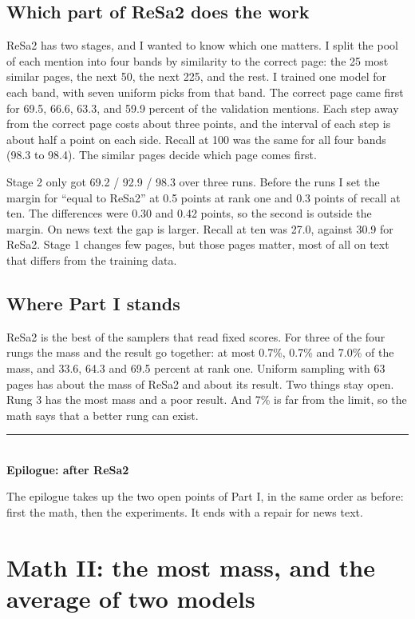 \documentclass[11pt]{article}
\theoremstyle{definition}
\newcommand{\partline}[1]{\vspace{1.2em}\noindent\rule{\textwidth}{0.4pt}\\[0.3em]{\Large\bfseries #1}\par\vspace{0.4em}}
\begin{document}
\subsection{Which part of ReSa2 does the work}
\label{sec:parts}

ReSa2 has two stages, and I wanted to know which one matters. I split the pool of each mention into four bands by similarity to the correct page: the 25 most similar pages, the next 50, the next 225, and the rest. I trained one model for each band, with seven uniform picks from that band. The correct page came first for 69.5, 66.6, 63.3, and 59.9 percent of the validation mentions. Each step away from the correct page costs about three points, and the interval of each step is about half a point on each side. Recall at 100 was the same for all four bands (98.3 to 98.4). The similar pages decide which page comes first.

Stage 2 only got 69.2 / 92.9 / 98.3 over three runs. Before the runs I set the margin for ``equal to ReSa2'' at 0.5 points at rank one and 0.3 points of recall at ten. The differences were 0.30 and 0.42 points, so the second is outside the margin. On news text the gap is larger. Recall at ten was 27.0, against 30.9 for ReSa2. Stage 1 changes few pages, but those pages matter, most of all on text that differs from the training data.

\subsection{Where Part I stands}

ReSa2 is the best of the samplers that read fixed scores. For three of the four rungs the mass and the result go together: at most 0.7\%, 0.7\% and 7.0\% of the mass, and 33.6, 64.3 and 69.5 percent at rank one. Uniform sampling with 63 pages has about the mass of ReSa2 and about its result. Two things stay open. Rung 3 has the most mass and a poor result. And 7\% is far from the limit, so the math says that a better rung can exist.

\partline{Epilogue: after ReSa2}

The epilogue takes up the two open points of Part I, in the same order as before: first the math, then the experiments. It ends with a repair for news text.

\section{Math II: the most mass, and the average of two models}
\label{sec:math2}
\end{document}
